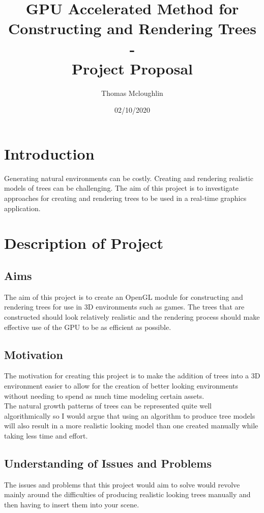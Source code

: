\documentclass[proposal]{cmpreport}
\title{GPU Accelerated Method for Constructing and Rendering Trees 
        \\ - \\ 
        Project Proposal}
\author{Thomas Mcloughlin}
\date{02/10/2020}
\begin{document}
\maketitle

\pagebreak
\section{Introduction}
Generating natural environments can be costly. Creating and rendering realistic 
models of trees can be challenging. The aim of this project is to investigate 
approaches for creating and rendering trees to be used in a real-time graphics 
application.

\section{Description of Project}

\subsection{Aims}
The aim of this project is to create an OpenGL module for constructing and rendering 
trees for use in 3D environments such as games. The trees that are constructed should 
look relatively realistic and the rendering process should make effective use of the 
GPU to be as efficient as possible.

\subsection{Motivation}
The motivation for creating this project is to make the addition of trees into a 3D 
environment easier to allow for the creation of better looking environments without 
needing to spend as much time modeling certain assets. \\
The natural growth patterns of trees can be represented quite well algorithmically so 
I would argue that using an algorithm to produce tree models will also result in a 
more realistic looking model than one created manually while taking less time and 
effort.

\subsection{Understanding of Issues and Problems}
The issues and problems that this project would aim to solve would revolve mainly 
around the difficulties of producing realistic looking trees manually and then having 
to insert them into your scene. \\
\end{document}
